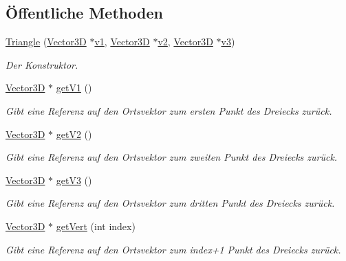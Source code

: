 \subsection*{Öffentliche Methoden}
\begin{DoxyCompactItemize}
\item 
\hyperlink{classTriangle_aa25e2e56ac291e4366474fcbdcc6901b}{Triangle} (\hyperlink{classVector3D}{Vector3\-D} $\ast$\hyperlink{particle__sim_2ParticleSystem_8h_a8d89db3c6515289b4df99467371c544f}{v1}, \hyperlink{classVector3D}{Vector3\-D} $\ast$\hyperlink{particle__sim_2ParticleSystem_8h_aadda57ca88b1f7b495ff17bc402bb584}{v2}, \hyperlink{classVector3D}{Vector3\-D} $\ast$\hyperlink{particle__sim_2ParticleSystem_8h_ac3e04ab93bb7f4e1e62ac7311bf75293}{v3})
\begin{DoxyCompactList}\small\item\em Der Konstruktor. \end{DoxyCompactList}\item 
\hyperlink{classVector3D}{Vector3\-D} $\ast$ \hyperlink{classTriangle_ae054a0eae5dae026c5af69274c5f277e}{get\-V1} ()
\begin{DoxyCompactList}\small\item\em Gibt eine Referenz auf den Ortsvektor zum ersten Punkt des Dreiecks zurück. \end{DoxyCompactList}\item 
\hyperlink{classVector3D}{Vector3\-D} $\ast$ \hyperlink{classTriangle_a6de5f8560482f4130bdbb96b25aa1b58}{get\-V2} ()
\begin{DoxyCompactList}\small\item\em Gibt eine Referenz auf den Ortsvektor zum zweiten Punkt des Dreiecks zurück. \end{DoxyCompactList}\item 
\hyperlink{classVector3D}{Vector3\-D} $\ast$ \hyperlink{classTriangle_a792a627dc42adad87c0b30e16a6b5824}{get\-V3} ()
\begin{DoxyCompactList}\small\item\em Gibt eine Referenz auf den Ortsvektor zum dritten Punkt des Dreiecks zurück. \end{DoxyCompactList}\item 
\hyperlink{classVector3D}{Vector3\-D} $\ast$ \hyperlink{classTriangle_a9320d1ab83c104352bf5e8f2c8274334}{get\-Vert} (int index)
\begin{DoxyCompactList}\small\item\em Gibt eine Referenz auf den Ortsvektor zum index+1 Punkt des Dreiecks zurück. \end{DoxyCompactList}\item 

\end{DoxyCompactItemize}
